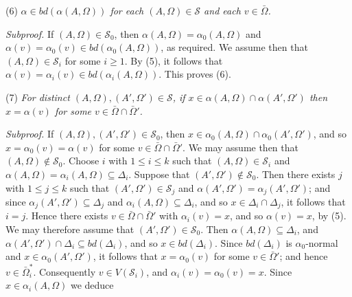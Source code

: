 \hspace*{12pt}(6) \textit{$\alpha \in bd(\alpha(A, \Omega))$ for each $(A, \Omega) \in \mathscr{S}$ and each $v \in \bar{\Omega}$.}

\textit{Subproof.} If $(A, \Omega) \in \mathscr{S}_0$, then $\alpha(A, \Omega) = \alpha_0(A, \Omega)$ and $\alpha(v) = \alpha_0(v) \in bd(\alpha_0(A, \Omega))$, as required. We assume then that $(A, \Omega) \in \mathscr{S}_i$ for some $i \ge 1$. By (5), it follows that $\alpha(v) = \alpha_i(v) \in bd(\alpha_i(A, \Omega))$. This proves (6).

\hspace*{12pt}(7) \textit{For distinct $(A, \Omega), (A', \Omega') \in \mathscr{S}$, if $x \in \alpha(A, \Omega) \cap \alpha(A', \Omega')$ then $x = \alpha(v)$ for some $v \in \bar{\Omega} \cap \bar{\Omega}'$.}

\textit{Subproof.} If $(A, \Omega), (A', \Omega') \in \mathscr{S}_0$, then $x \in \alpha_0(A, \Omega) \cap \alpha_0(A', \Omega')$, and so $x = \alpha_0(v) = \alpha(v)$ for some $v \in \bar{\Omega} \cap \bar{\Omega}'$. We may assume then that $(A, \Omega) \notin \mathscr{S}_0$. Choose $i$ with $1 \le i \le k$ such that $(A, \Omega) \in \mathscr{S}_i$ and $\alpha(A, \Omega) = \alpha_i(A, \Omega) \subseteq \Delta_i$. Suppose that $(A', \Omega') \notin \mathscr{S}_0$. Then there exists $j$ with $1 \le j \le k$ such that $(A', \Omega') \in \mathscr{S}_j$ and $\alpha(A', \Omega') = \alpha_j(A', \Omega')$; and since $\alpha_j(A', \Omega') \subseteq \Delta_j$ and $\alpha_i(A, \Omega) \subseteq \Delta_i$, and so $x \in \Delta_i \cap \Delta_j$, it follows that $i = j$. Hence there exists $v \in \bar{\Omega} \cap \bar{\Omega}'$ with $\alpha_i(v) = x$, and so $\alpha(v) = x$, by (5). We may therefore assume that $(A', \Omega') \in \mathscr{S}_0$. Then $\alpha(A, \Omega) \subseteq \Delta_i$, and $\alpha(A', \Omega') \cap \Delta_i \subseteq bd(\Delta_i)$, and so $x \in bd(\Delta_i)$. Since $bd(\Delta_i)$ is $\alpha_0$-normal and $x \in \alpha_0(A', \Omega')$, it follows that $x = \alpha_0(v)$ for some $v \in \bar{\Omega}'$; and hence $v \in \bar{\Omega}_i^*$. Consequently $v \in V(\mathscr{S}_i)$, and $\alpha_i(v) = \alpha_0(v) = x$. Since $x \in \alpha_i(A, \Omega)$ we deduce
